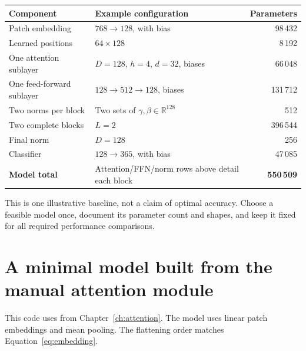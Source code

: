 \documentclass[11pt,a4paper,oneside]{report}
\newcommand{\R}{\mathbb{R}}
\newcommand{\code}[1]{\texttt{\detokenize{#1}}}
\begin{document}
\begin{center}
\begin{tabularx}{\textwidth}{@{}lY r@{}}
\toprule
Component & Example configuration & Parameters\\\midrule
Patch embedding & $768\to128$, with bias & 98\,432\\
Learned positions & $64\times128$ & 8\,192\\
One attention sublayer & $D=128$, $h=4$, $d=32$, biases & 66\,048\\
One feed-forward sublayer & $128\to512\to128$, biases & 131\,712\\
Two norms per block & Two sets of $\gamma,\beta\in\R^{128}$ & 512\\
Two complete blocks & $L=2$ & 396\,544\\
Final norm & $D=128$ & 256\\
Classifier & $128\to365$, with bias & 47\,085\\\midrule
\textbf{Model total} & Attention/FFN/norm rows above detail each block & \textbf{550\,509}\\
\bottomrule
\end{tabularx}
\end{center}
This is one illustrative baseline, not a claim of optimal accuracy. Choose a
feasible model once, document its parameter count and shapes, and keep it fixed
for all required performance comparisons.

\newpage
\section{A minimal model built from the manual attention module}
This code uses \code{ManualAttention} from Chapter~\ref{ch:attention}.
The model uses linear patch embeddings and mean pooling.
The flattening order matches Equation~\eqref{eq:embedding}.
\end{document}

